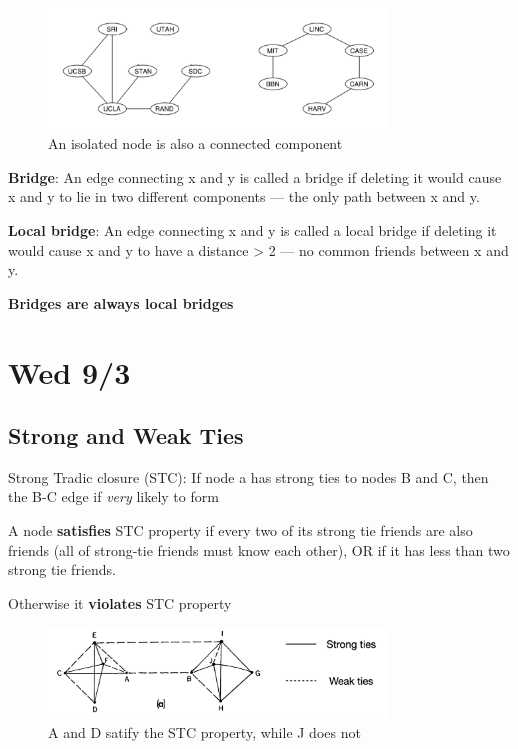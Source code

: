 \documentclass[14pt, letterpaper, oneside]{extarticle}
\begin{document}
\begin{figure}[H]
    \includegraphics[width=0.8\textwidth]{images/1}
    \caption{An isolated node is also a connected component}
\end{figure}

\textbf{Bridge}: An edge connecting x and y is called a bridge if deleting it would cause x and y to lie in two
different components — the only path between x and y.

\textbf{Local bridge}: An edge connecting x and y is called a local bridge if deleting it would cause x and y to have a
distance > 2 — no common friends between x and y.

\textbf{Bridges are always local bridges}
 

\section{Wed 9/3}
\subsection{Strong and Weak Ties}

Strong Tradic closure (STC): If node a has strong ties to nodes B and C, then the B-C edge if \textit{very} likely to form

A node \textbf{satisfies} STC property if every two of its strong tie friends are also friends (all of strong-tie friends must know each other), OR if it has less than two strong tie friends.

Otherwise it \textbf{violates} STC property

\begin{figure}[H]
    \includegraphics[width=0.8\textwidth]{images/2}
    \caption{A and D satify the STC property, while J does not}
\end{figure}
\end{document}
